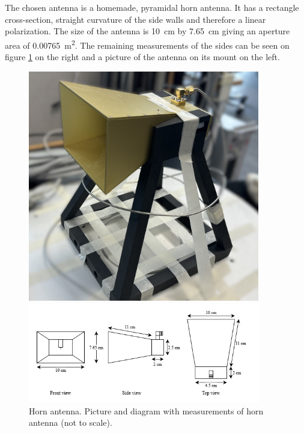 The chosen antenna is a homemade, pyramidal horn antenna. It has a rectangle cross-section, straight curvature of the side walls and therefore a linear polarization. The size of the antenna is \SI{10}{\centi\meter} by \SI{7.65}{\centi\meter} giving an aperture area of \SI{0.00765}{\meter\squared}. The remaining measurements of the sides can be seen on figure \ref{fig:horn_design} on the right and a picture of the antenna on its mount on the left.

\begin{figure}[H]
    \begin{minipage}{0.35\textwidth}
        \centering
        \includegraphics[width=0.9\textwidth]{figures/IMG_2430.JPEG} %
    \end{minipage}\hfill
    \begin{minipage}{0.6\textwidth}
        \centering
        \includegraphics[width=0.9\textwidth]{figures/horn_diagram.png} %
    \end{minipage}
    \caption{Horn antenna. Picture and diagram with measurements of horn antenna (not to scale).}
    \label{fig:horn_design}
\end{figure}

